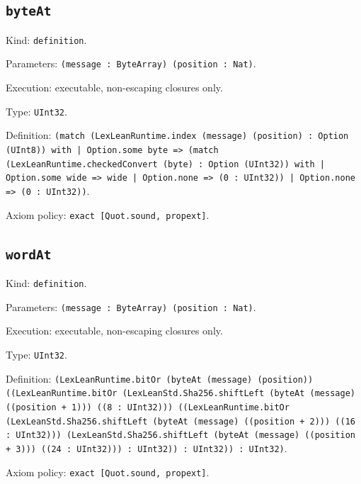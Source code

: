 \documentclass[11pt]{article}
\begin{document}
\subsection*{\texttt{byteAt}}
\noindent Kind: \texttt{definition}.\par
\noindent Parameters: \texttt{(message : ByteArray) (position : Nat)}.\par
\noindent Execution: executable, non-escaping closures only.\par
\noindent Type: \texttt{UInt32}.\par
\noindent Definition: \texttt{(match (LexLeanRuntime.index (message) (position) : Option (UInt8)) with | Option.some byte => (match (LexLeanRuntime.checkedConvert (byte) : Option (UInt32)) with | Option.some wide => wide | Option.none => (0 : UInt32)) | Option.none => (0 : UInt32))}.\par
\noindent Axiom policy: \texttt{exact [Quot.sound, propext]}.\par
\subsection*{\texttt{wordAt}}
\noindent Kind: \texttt{definition}.\par
\noindent Parameters: \texttt{(message : ByteArray) (position : Nat)}.\par
\noindent Execution: executable, non-escaping closures only.\par
\noindent Type: \texttt{UInt32}.\par
\noindent Definition: \texttt{(LexLeanRuntime.bitOr (byteAt (message) (position)) ((LexLeanRuntime.bitOr (LexLeanStd.Sha256.shiftLeft (byteAt (message) ((position + 1))) ((8 : UInt32))) ((LexLeanRuntime.bitOr (LexLeanStd.Sha256.shiftLeft (byteAt (message) ((position + 2))) ((16 : UInt32))) (LexLeanStd.Sha256.shiftLeft (byteAt (message) ((position + 3))) ((24 : UInt32))) : UInt32)) : UInt32)) : UInt32)}.\par
\noindent Axiom policy: \texttt{exact [Quot.sound, propext]}.\par
\end{document}
